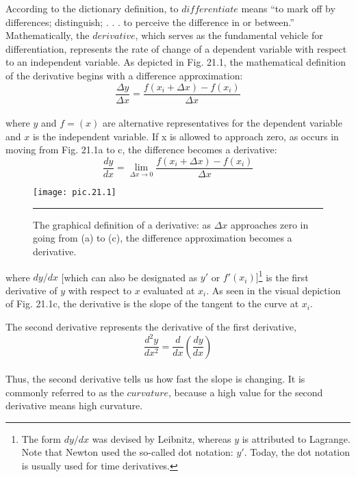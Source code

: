 \documentclass[../main.tex]{subfiles}
\begin{document}
According to the dictionary definition, to $differentiate$ means “to mark off by differences; distinguish; . . . to perceive the difference in or between.” Mathematically, the $derivative$, which serves as the fundamental vehicle for differentiation, represents the rate of change
of a dependent variable with respect to an independent variable. As depicted in Fig. 21.1, the
mathematical definition of the derivative begins with a difference approximation:
\begin{equation}
	\tag{21.6}
	\dfrac{\Delta y}{\Delta x} = \dfrac{f(x_{i} + \Delta x)-f(x_{i})}{\Delta x}
\end{equation}\\
where $y$ and $f=(x)$ are alternative representatives for the dependent variable and $x$ is the
independent variable. If x is allowed to approach zero, as occurs in moving from Fig. 21.1a
to c, the difference becomes a derivative:
\begin{equation}
	\tag{21.7}
	\dfrac{dy}{dx} = \lim \limits_{\Delta x \longrightarrow 0} \dfrac{f(x_{i} + \Delta x) - f(x_{i})}{\Delta x}
\end{equation}



\begin{figure}[hbt!]
	\centering
	\texttt{[image: pic.21.1]}
	\caption{\textsf{The graphical definition of a derivative: as $\Delta x$ approaches zero in going from (a) to (c), the difference approximation
becomes a derivative. }} \hrule
	\label{pic.21.1}
\end{figure}
\pagebreak
where $dy/dx$ [which can also be designated as $y'$ or $f'(x_{i})]$\footnote{ The form $dy/dx$ was devised by Leibnitz, whereas $y$ is attributed to Lagrange. Note that Newton used the 
so-called dot notation: $y'$. Today, the dot notation is usually used for time derivatives.} is the first derivative of $y$ with
respect to $x$ evaluated at $x_{i}$. As seen in the visual depiction of Fig. 21.1c, the derivative is
the slope of the tangent to the curve at $x_{i}$.

The second derivative represents the derivative of the first derivative,
\begin{equation}
	\tag{21.8}
	\dfrac{d^{2} y}{dx^{2}} = \dfrac{d}{dx} \left( \dfrac{dy}{dx} \right)
\end{equation}\\
Thus, the second derivative tells us how fast the slope is changing. It is commonly referred
to as the $curvature$, because a high value for the second derivative means high curvature.
\end{document}
